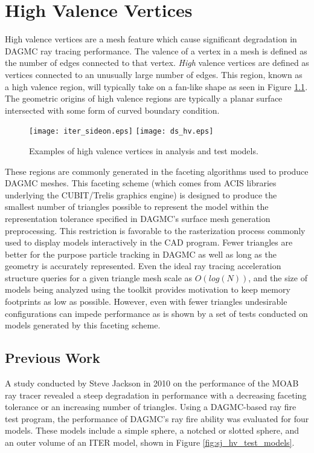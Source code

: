 
\chapter{High Valence Vertices}\label{ch:high_valence}

High valence vertices are a mesh feature which cause significant degradation in
DAGMC ray tracing performance. The valence of a vertex in a mesh is defined as
the number of edges connected to that vertex. \textit{High} valence vertices are
defined as vertices connected to an unusually large number of edges. This
region, known as a high valence region, will typically take on a fan-like shape
as seen in Figure \ref{fig:hv_examples}.  The geometric origins of high valence
regions are typically a planar surface intersected with some form of curved
boundary condition. 

\begin{figure}[H]
  \centering
  \texttt{[image: iter\_sideon.eps]}
  \texttt{[image: ds\_hv.eps]}
  \caption{Examples of high valence vertices in analysis and test models.}
  \label{fig:hv_examples}
\end{figure}

These regions are commonly generated in the faceting algorithms used to produce
DAGMC meshes. This faceting scheme (which comes from ACIS libraries underlying
the CUBIT/Trelis graphics engine) is designed to produce the smallest number of
triangles possible to represent the model within the representation tolerance
specified in DAGMC's surface mesh generation preprocessing. This restriction is
favorable to the rasterization process commonly used to display models
interactively in the CAD program. Fewer triangles are better for the purpose
particle tracking in DAGMC as well as long as the geometry is accurately
represented. Even the ideal ray tracing acceleration structure queries for a
given triangle mesh scale as $O(log(N))$, and the size of models being analyzed
using the toolkit provides motivation to keep memory footprints as low as
possible. However, even with fewer triangles undesirable configurations can
impede performance as is shown by a set of tests conducted on models generated
by this faceting scheme.

\section{Previous Work}

A study conducted by Steve Jackson in 2010 on the performance of the MOAB ray
tracer revealed a steep degradation in performance with a decreasing faceting
tolerance or an increasing number of triangles. Using a DAGMC-based ray fire
test program, the performance of DAGMC's ray fire ability was evaluated for four
models. These models include a simple sphere, a notched or slotted sphere, and
an outer volume of an ITER model, shown in Figure \ref{fig:sj_hv_test_models}.

